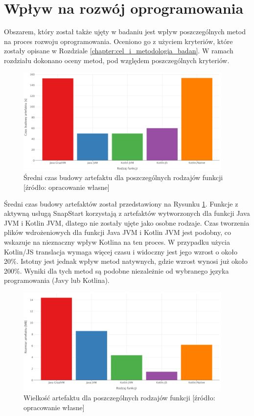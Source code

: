\section{Wpływ na rozwój oprogramowania}\label{chapter:development-process}

Obszarem, który został także ujęty w badaniu jest wpływ poszczególnych metod na proces rozwoju oprogramowania.
Oceniono go z użyciem kryteriów, które zostały opisane w Rozdziale \ref{chapter:cel_i_metodologia_badan}.
W ramach rozdziału dokonano oceny metod, pod względem poszczególnych kryteriów.

\begin{figure}[h]
    \centering
    \includegraphics[width=0.95\textwidth]{charts/results/avg-build-times.png}
    \caption{Średni czas budowy artefaktu dla poszczególnych rodzajów funkcji [źródło: opracowanie własne]}
    \label{fig:avg_build_times}
\end{figure}

Średni czas budowy artefaktów został przedstawiony na Rysunku \ref{fig:avg_build_times}.
Funkcje z aktywną usługą SnapStart korzystają z artefaktów wytworzonych dla funkcji Java JVM i Kotlin JVM, dlatego nie zostały ujęte jako osobne rodzaje.
Czas tworzenia plików wdrożeniowych dla funkcji Java JVM i Kotlin JVM jest podobny, co wskazuje na nieznaczny wpływ Kotlina na ten proces.
W przypadku użycia Kotlin/JS translacja wymaga więcej czasu i widoczny jest jego wzrost o około 20\%.
Istotny jest jednak wpływ metod natywnych, gdzie wzrost wynosi już około 200\%.
Wyniki dla tych metod są podobne niezależnie od wybranego języka programowania (Javy lub Kotlina).

\begin{figure}[h]
    \centering
    \includegraphics[width=0.95\textwidth]{charts/results/artifact-size.png}
    \caption{Wielkość artefaktu dla poszczególnych rodzajów funkcji [źródło: opracowanie własne]}
    \label{fig:artifact_size}
\end{figure}

